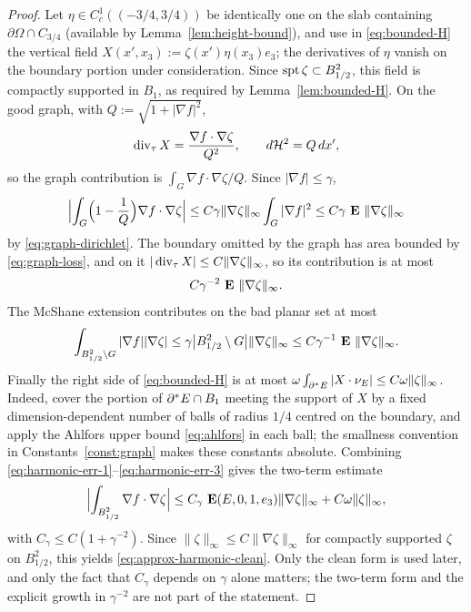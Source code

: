 \begin{proof}
Let $\eta\in C^1_c((-3/4,3/4))$ be identically one on the slab containing
$\partial\Omega\cap C_{3/4}$ (available by
Lemma~\ref{lem:height-bound}), and use in \eqref{eq:bounded-H} the vertical
field $X(x',x_3):=\zeta(x')\eta(x_3)e_3$; the derivatives of $\eta$ vanish on
the boundary portion under consideration.  Since
$\operatorname{spt}\zeta\subset B^2_{1/2}$, this field is compactly supported in $B_1$, as
required by Lemma~\ref{lem:bounded-H}.  On the good graph, with
$Q:=\sqrt{1+|\nabla f|^2}$,
\begin{equation}\label{eq:graph-divergence}
  \operatorname{div}_\tau X=\frac{\nabla f\cdot\nabla\zeta}{Q^2},
  \qquad
  d\mathcal H^2=Q\,dx',
\end{equation}
so the graph contribution is $\int_G\nabla f\cdot\nabla\zeta/Q$.  Since
$|\nabla f|\le\gamma$,
\begin{equation}\label{eq:harmonic-err-1}
  \Bigl|\int_G\Bigl(1-\frac1Q\Bigr)\nabla f\cdot\nabla\zeta\Bigr|
  \le C\gamma\|\nabla\zeta\|_\infty\int_G|\nabla f|^2
  \le C\gamma\,\operatorname{\mathbf E}\,\|\nabla\zeta\|_\infty
\end{equation}
by \eqref{eq:graph-dirichlet}.  The boundary omitted by the graph has area
bounded by \eqref{eq:graph-loss}, and on it
$|\operatorname{div}_\tau X|\le C\|\nabla\zeta\|_\infty$, so its contribution is at most
\begin{equation}\label{eq:harmonic-err-2}
  C\gamma^{-2}\,\operatorname{\mathbf E}\,\|\nabla\zeta\|_\infty .
\end{equation}
The McShane extension contributes on the bad planar set at most
\begin{equation}\label{eq:harmonic-err-3}
  \int_{B^2_{1/2}\setminus G}|\nabla f||\nabla\zeta|
  \le\gamma\bigl|B^2_{1/2}\setminus G\bigr|\|\nabla\zeta\|_\infty
  \le C\gamma^{-1}\,\operatorname{\mathbf E}\,\|\nabla\zeta\|_\infty .
\end{equation}
Finally the right side of \eqref{eq:bounded-H} is at most
$\omega\int_{\partial^* E}|X\cdot\nu_E|\le C\omega\|\zeta\|_\infty$.  Indeed,
cover the portion of $\partial^* E\cap B_1$ meeting the support of $X$ by a fixed
dimension-dependent number of balls of radius $1/4$ centred on the boundary,
and apply the Ahlfors upper bound \eqref{eq:ahlfors} in each ball; the
smallness convention in Constants~\ref{const:graph} makes these constants
absolute.  Combining
\eqref{eq:harmonic-err-1}--\eqref{eq:harmonic-err-3} gives the two-term
estimate
\begin{equation}\label{eq:approx-harmonic}
  \Bigl|\int_{B^2_{1/2}}\nabla f\cdot\nabla\zeta\Bigr|
  \le C_\gamma\,\operatorname{\mathbf E}(E,0,1,e_3)\|\nabla\zeta\|_\infty
   +C\omega\|\zeta\|_\infty ,
\end{equation}
with $C_\gamma\le C(1+\gamma^{-2})$.  Since
$\|\zeta\|_\infty\le C\|\nabla\zeta\|_\infty$ for compactly supported
$\zeta$ on $B^2_{1/2}$, this yields \eqref{eq:approx-harmonic-clean}.  Only
the clean form is used later, and only the fact that $C_\gamma$ depends on
$\gamma$ alone matters; the two-term form and the explicit growth in
$\gamma^{-2}$ are not part of the statement.


\end{proof}
